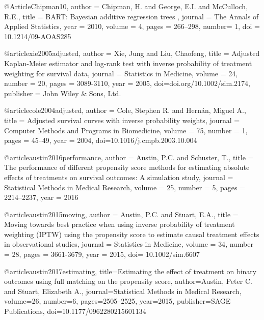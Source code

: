 @Article{Chipman10,
   author =   {Chipman, H. and George, E.I.   and McCulloch, R.E.},
   title =    {BART: Bayesian additive regression trees },
   journal =  {The Annals of Applied Statistics},
   year =    {2010},
   volume =   {4},
   pages =   {266--298},
   number= {1},
   doi = {10.1214/09-AOAS285}
 }






@article{xie2005adjusted,
  author = {Xie, Jung and Liu, Chaofeng},
  title = {Adjusted Kaplan-Meier estimator and log-rank test with inverse probability of treatment weighting for survival data},
  journal = {Statistics in Medicine},
  volume = {24},
  number = {20},
  pages = {3089-3110},
  year = {2005},
  doi={doi.org/10.1002/sim.2174},
  publisher = {John Wiley & Sons, Ltd.}
}





@article{cole2004adjusted,
  author = {Cole, Stephen R. and Hernán, Miguel A.},
  title = {Adjusted survival curves with inverse probability weights},
  journal = {Computer Methods and Programs in Biomedicine},
  volume = {75},
  number = {1},
  pages = {45--49},
  year = {2004},
  doi={10.1016/j.cmpb.2003.10.004}
}






@article{austin2016performance,
  author = {Austin, P.C. and Schuster, T.},
  title = {The performance of different propensity score methods for estimating absolute effects of treatments on survival outcomes: A simulation study},
  journal = {Statistical Methods in Medical Research},
  volume = {25},
  number = {5},
  pages = {2214--2237},
  year = {2016}
}





@article{austin2015moving,
  author = {Austin, P.C. and Stuart, E.A.},
  title = {Moving towards best practice when using inverse probability of treatment weighting (IPTW) using the propensity score to estimate causal treatment effects in observational studies},
  journal = {Statistics in Medicine},
  volume = {34},
  number = {28},
  pages = {3661-3679},
  year = {2015},
  doi= {10.1002/sim.6607}
}





@article{austin2017estimating,
  title={Estimating the effect of treatment on binary outcomes using full matching on the propensity score},
  author={Austin, Peter C. and Stuart, Elizabeth A.},
  journal={Statistical Methods in Medical Research},
  volume={26},
  number={6},
  pages={2505--2525},
  year={2015},
  publisher={SAGE Publications},
  doi={10.1177/0962280215601134}
}





